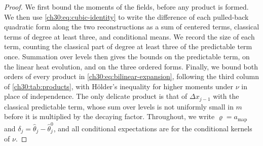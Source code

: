 \begin{proof}
We first bound the moments of the fields, before any product is formed. We then use \eqref{ch30:eq:cubic-identity} to write the difference of each pulled-back quadratic form along the two reconstructions as a sum of centered terms, classical terms of degree at least three, and conditional means. We record the size of each term, counting the classical part of degree at least three of the predictable term once. Summation over levels then gives the bounds on the predictable term, on the linear heat evolution, and on the three ordered forms. Finally, we bound both orders of every product in \eqref{ch30:eq:bilinear-expansion}, following the third column of \cref{ch30:tab:products}, with H\"older's inequality for higher moments under $\nu$ in place of independence. The only delicate product is that of $\Delta x_{j-1}$ with the classical predictable term, whose sum over levels is not uniformly small in $m$ before it is multiplied by the decaying factor. Throughout, we write $\varrho=a_{\mathrm{map}}$ and $\delta_j=\widehat\theta_j-\widehat\theta_j^0$, and all conditional expectations are for the conditional kernels of $\nu$.


\end{proof}
